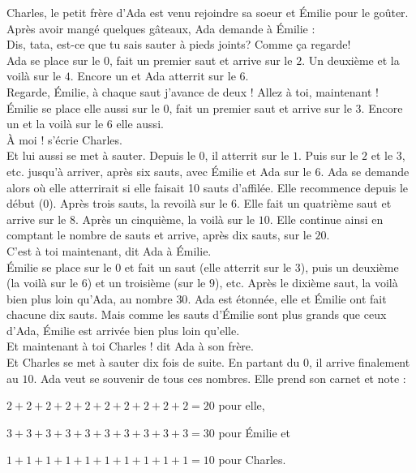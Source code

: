Charles, le petit frère d'Ada est venu rejoindre sa soeur et Émilie pour le goûter. Après avoir mangé quelques gâteaux, Ada demande à Émilie : \\
\guillemotleft Dis, tata, est-ce que tu sais sauter à pieds joints? Comme ça regarde! \guillemotright\\
Ada se place sur le $0$, fait un premier saut et arrive sur le $2$. Un deuxième et la voilà sur le $4$. Encore un et Ada atterrit sur le $6$.\\
\guillemotleft Regarde, Émilie, à chaque saut j’avance de deux ! Allez à toi, maintenant ! \guillemotright\\
Émilie se place elle aussi sur le $0$, fait un premier saut et arrive sur le $3$. Encore un et la voilà sur le $6$ elle aussi. \\
\guillemotleft À moi ! s'écrie Charles. \guillemotright\\
Et lui aussi se met à sauter. Depuis le $0$, il atterrit sur le $1$. Puis sur le $2$ et le $3$, etc. jusqu'à arriver, après six sauts, avec Émilie et Ada sur le $6$.
Ada se demande alors où elle atterrirait si elle faisait 10 sauts d'affilée. 
Elle recommence depuis le début ($0$). Après trois sauts, la revoilà sur le $6$. 
Elle fait un quatrième saut et arrive sur le $8$. 
Après un cinquième, la voilà sur le $10$. Elle continue ainsi en comptant le nombre de sauts et arrive, après dix sauts, sur le $20$. \\
\guillemotleft C’est à toi maintenant, dit Ada à Émilie. \guillemotright\\
Émilie se place sur le $0$ et fait un saut (elle atterrit sur le $3$), puis un deuxième (la voilà sur le $6$) et un troisième (sur le $9$), etc. Après le dixième saut, la voilà bien plus loin qu’Ada, au nombre $30$.
Ada est étonnée, elle et Émilie ont fait chacune dix sauts. Mais comme les sauts d’Émilie sont plus grands que ceux d’Ada, Émilie est arrivée bien plus loin qu’elle.\\ 
\guillemotleft Et maintenant à toi Charles ! dit Ada à son frère. \guillemotright\\
Et Charles se met à sauter dix fois de suite. En partant du $0$, il arrive finalement au $10$.
Ada veut se souvenir de tous ces nombres. Elle prend son carnet et note :
\begin{description}[leftmargin=0.5cm]
    \item $2+2+2+2+2+2+2+2+2+2=20$ pour elle,
    \item $3+3+3+3+3+3+3+3+3+3=30$ pour Émilie et
    \item $1+1+1+1+1+1+1+1+1+1=10$ pour Charles.
\end{description}
